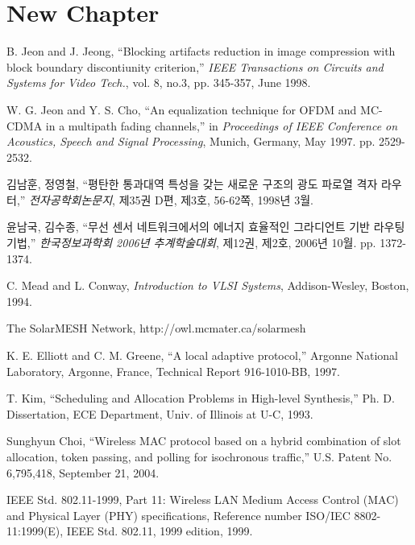 \documentclass[doctor]{ewhacse}
\begin{document}
\chapter{New Chapter}

\lipsum[1]

%
%
%  

\begin{thebibliography}{00}
	
	 B. Jeon and J. Jeong, ``Blocking artifacts
	reduction in image compression with block boundary discontiunity
	criterion,'' {\em IEEE Transactions on Circuits and Systems for
		Video Tech.}, vol. 8, no.3, pp. 345-357, June 1998.
	
	 W. G. Jeon and Y. S. Cho, ``An equalization
	technique for OFDM and MC-CDMA in a multipath fading channels,''
	in {\em Proceedings of IEEE Conference on Acoustics, Speech and
		Signal Processing}, Munich, Germany, May 1997. pp. 2529-2532.
	
	 김남훈, 정영철, ``평탄한 통과대역 특성을 갖는
	새로운 구조의 광도 파로열 격자 라우터,'' {\em 전자공학회논문지},
	제35권 D편, 제3호, 56-62쪽, 1998년 3월.
	
	 윤남국, 김수종, ``무선 센서 네트워크에서의 에너지
	효율적인 그라디언트 기반 라우팅 기법,'' {\em 한국정보과학회
		2006년 추계학술대회}, 제12권, 제2호, 2006년 10월. pp.
	1372-1374.
	
	 C. Mead and L. Conway, {\em Introduction to VLSI
		Systems}, Addison-Wesley, Boston, 1994.
	
	 The SolarMESH Network,
	http://owl.mcmater.ca/solarmesh
	
	 K. E. Elliott and C. M. Greene, ``A local adaptive
	protocol,'' Argonne National Laboratory, Argonne, France,
	Technical Report 916-1010-BB, 1997.
	
	 T. Kim, ``Scheduling and Allocation Problems in
	High-level Synthesis,'' Ph. D. Dissertation, ECE Department,
	Univ. of Illinois at U-C, 1993.
	
	 Sunghyun Choi, ``Wireless MAC protocol based on a
	hybrid combination of slot allocation, token passing, and
	polling for isochronous traffic,'' U.S. Patent No. 6,795,418,
	September 21, 2004.
	
	 IEEE Std. 802.11-1999, Part 11: Wireless LAN
	Medium Access Control (MAC) and Physical Layer (PHY)
	specifications, Reference number ISO/IEC 8802-11:1999(E), IEEE
	Std. 802.11, 1999 edition, 1999.

	
\end{thebibliography}
\end{document}

